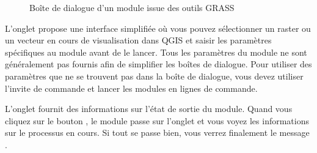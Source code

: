 \begin{figure}[h]
\centering
\caption{Bo\^ite de dialogue d'un module issue des outils GRASS \nixcaption}\label{fig:grass_module_dialog}
   \goodgap
   \goodgap
\end{figure}


L'onglet  propose une interface simplifi\'ee o\`u vous pouvez s\'electionner un raster ou un vecteur en cours de visualisation dans QGIS et
saisir les param\`etres sp\'ecifiques au module avant de le lancer. Tous les param\`etres du module ne sont g\'en\'eralement pas fournis afin de simplifier
les bo\^ites de dialogue. Pour utiliser des param\`etres que ne se trouvent pas dans la bo\^ite de dialogue, vous devez utiliser l'invite de commande
et lancer les modules en lignes de commande.


L'onglet  fournit des informations sur l'\'etat de sortie du module. Quand vous cliquez sur le bouton , le module passe sur l'onglet  et vous voyez les informations sur le processus en cours. Si tout se passe bien, vous verrez finalement le message .

